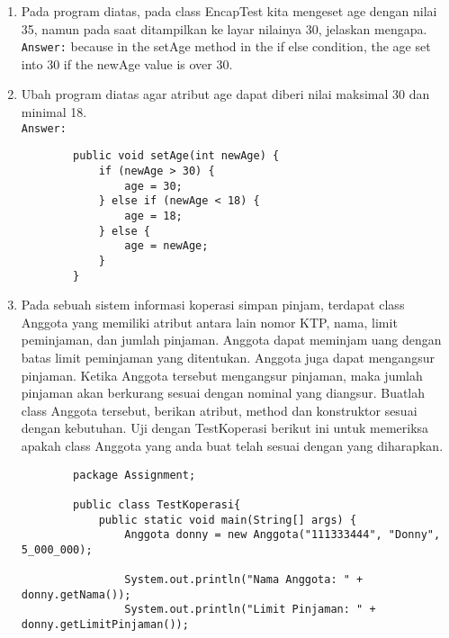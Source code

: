 \documentclass[12pt,titlepage]{article}
\begin{document}
\begin{enumerate}
\begin{verbatim}
    \end{verbatim}
    \texttt{Answer:} 
    \begin{verbatim}
        PS D:\Kuliah>  & 'C:\Program Files\Java\jdk-18.0.2.1\bin\java.exe' '-XX:+ShowCodeDetailsInExceptionMessages' '-cp' 'C:\Users\G4CE-PC\AppData\Roaming\Code\User\workspaceStorage\ 80d97a47d24665dc0bce7ab1e048ecbd\redhat.java\jdt_ws\ Kuliah_28156aa7\bin' 'Assignment.EncapTest'
        Name : James
        Age : 30
    \end{verbatim}
    \item Pada program diatas, pada class EncapTest kita mengeset age dengan nilai 35, namun pada saat ditampilkan ke layar nilainya 30, jelaskan mengapa. \\ 
    \texttt{Answer:} because in the setAge method in the if else condition, the age set into 30 if the newAge value is over 30.
    \item Ubah program diatas agar atribut age dapat diberi nilai maksimal 30 dan minimal 18. \\ 
    \texttt{Answer:} 
    \begin{verbatim}
        public void setAge(int newAge) {
            if (newAge > 30) {
                age = 30;
            } else if (newAge < 18) {
                age = 18;
            } else {
                age = newAge;
            }
        }
    \end{verbatim}
    \item Pada sebuah sistem informasi koperasi simpan pinjam, terdapat class Anggota yang memiliki atribut antara lain nomor KTP, nama, limit peminjaman, dan jumlah pinjaman. Anggota dapat meminjam uang dengan batas limit peminjaman yang ditentukan. Anggota juga dapat mengangsur pinjaman. Ketika Anggota tersebut mengangsur pinjaman, maka jumlah pinjaman akan berkurang sesuai dengan nominal yang diangsur. Buatlah class Anggota tersebut, berikan atribut, method dan konstruktor sesuai dengan kebutuhan. Uji dengan TestKoperasi berikut ini untuk memeriksa apakah class Anggota yang anda buat telah sesuai dengan yang diharapkan.
    \begin{verbatim}
        package Assignment;

        public class TestKoperasi{
            public static void main(String[] args) {
                Anggota donny = new Anggota("111333444", "Donny", 5_000_000);
                
                System.out.println("Nama Anggota: " + donny.getNama());
                System.out.println("Limit Pinjaman: " + donny.getLimitPinjaman());
                

\end{verbatim}
\end{enumerate}
\end{document}

